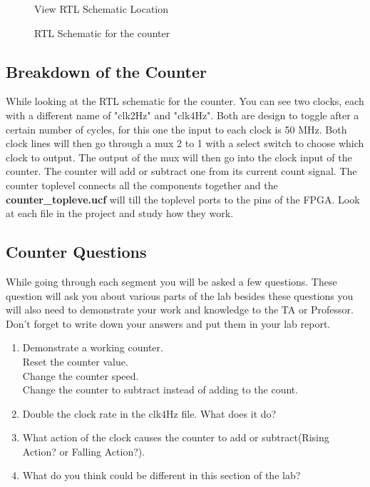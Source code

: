 \documentclass{article}
\begin{document}
\begin{figure}[!htb]
  \centering
  \caption{View RTL Schematic Location}
\end{figure}

\begin{figure}[!htb]
  \centering
  \caption{RTL Schematic for the counter}
\end{figure}

\subsection{Breakdown of the Counter}
While looking at the RTL schematic for the counter. You can see two clocks, each with a different name of "clk2Hz" and "clk4Hz". Both are design to toggle after a certain number of cycles, for this one the input to each clock is 50 MHz. Both clock lines will then go through a mux 2 to 1 with a select switch to choose which clock to output. The output of the mux will then go into the clock input of the counter. The counter will add or subtract one from its current count signal. The counter toplevel connects all the components together and the \textbf{counter\_topleve.ucf} will till the toplevel ports to the pins of the FPGA. Look at each file in the project and study how they work.

\subsection{Counter Questions}
While going through each segment you will be asked a few questions. These question will ask you about various parts of the lab besides these questions you will also need to demonstrate your work and knowledge to the TA or Professor. Don't forget to write down your answers and put them in your lab report.

\begin{enumerate}
  \item Demonstrate a working counter. \hfill \\
  Reset the counter value.\\
  Change the counter speed.\\
  Change the counter to subtract instead of adding to the count.
  \item Double the clock rate in the clk4Hz file. What does it do?
  \item What action of the clock causes the counter to add or subtract(Rising Action? or Falling Action?).
  \item What do you think could be different in this section of the lab?
\end{enumerate}
\end{document}
